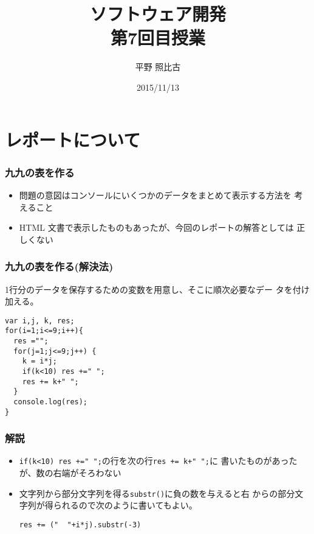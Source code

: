 
\title{ソフトウェア開発\\第7回目授業}
\author{平野 照比古}
\institute{}
\date{2015/11/13}
\newtheorem{Prob}{解説}

\frame{\maketitle}
\section{レポートについて}
\begin{frame}[containsverbatim]
 \frametitle{九九の表を作る}
 \begin{itemize}
	\item 問題の意図はコンソールにいくつかのデータをまとめて表示する方法を
				考えること
	\item HTML 文書で表示したものもあったが、今回のレポートの解答としては
				正しくない
 \end{itemize}
\end{frame}
\begin{frame}[containsverbatim]
 \frametitle{九九の表を作る(解決法)}
1行分のデータを保存するための変数を用意し、そこに順次必要なデー
				タを付け加える。
\begin{verbatim}
var i,j, k, res;
for(i=1;i<=9;i++){
  res ="";
  for(j=1;j<=9;j++) {
    k = i*j;
    if(k<10) res +=" ";
    res += k+" ";
  }
  console.log(res);
}
\end{verbatim}
\end{frame}
\begin{frame}[containsverbatim]
 \frametitle{解説}
 \begin{itemize}
	\item \texttt{if(k<10) res +=" ";}の行を次の行\texttt{res += k+" ";}に
				書いたものがあったが、数の右端がそろわない
	\item 文字列から部分文字列を得る\texttt{substr()}に負の数を与えると右
				からの部分文字列が得られるので次のように書いてもよい。

				\verb/res += /\verb*/("  "+i*j).substr(-3)/
 \end{itemize}
\end{frame}
